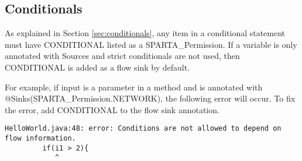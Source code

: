 \subsection{Conditionals}
As explained in Section \ref{sec:conditionals}, any item in a conditional statement must have CONDITIONAL listed as a SPARTA\_Permission.  If a variable is only annotated with Sources and strict conditionals are not used, then CONDITIONAL is added as a flow sink by default. 

For example, if input is a parameter in a method and is annotated with @Sinks(SPARTA\_Permission.NETWORK), the following error will occur.  To fix the error, add CONDITIONAL to the flow sink annotation.  

\begin{Verbatim}
HelloWorld.java:48: error: Conditions are not allowed to depend on flow information.
         if(i1 > 2){
            ^
\end{Verbatim}




